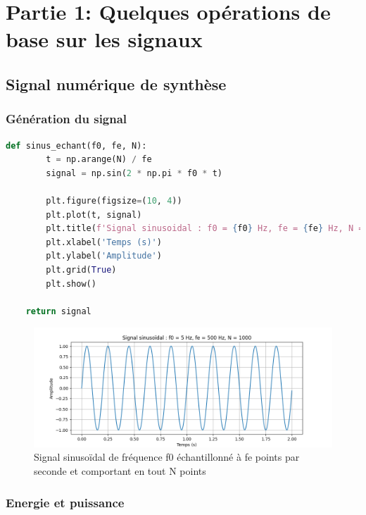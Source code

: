 \newpage

\section{Partie 1: Quelques opérations de base sur les signaux}

\subsection{Signal numérique de synthèse}

\subsubsection{Génération du signal}

\begin{lstlisting}[language=python]
    def sinus_echant(f0, fe, N):
        t = np.arange(N) / fe
        signal = np.sin(2 * np.pi * f0 * t)

        plt.figure(figsize=(10, 4))
        plt.plot(t, signal)
        plt.title(f'Signal sinusoidal : f0 = {f0} Hz, fe = {fe} Hz, N = {N}')
        plt.xlabel('Temps (s)')
        plt.ylabel('Amplitude')
        plt.grid(True)
        plt.show()

    return signal
\end{lstlisting}


\begin{figure}[!h]
\begin{center}
\includegraphics[width=17cm]{screenshots/signal_echantillone.png}
\end{center}
\caption{Signal sinusoïdal de fréquence f0 échantillonné à fe points
par seconde et comportant en tout N points}
\end{figure} 

\subsubsection{Energie et puissance}

